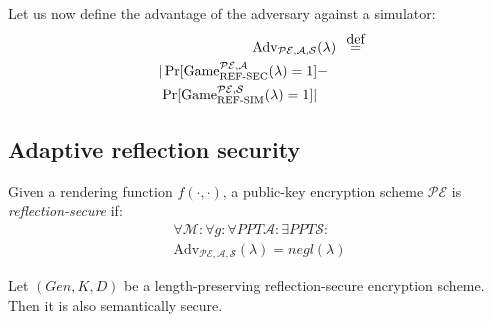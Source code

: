 Let us now define the advantage of the adversary against a simulator:
\begin{align*}
    \text{Adv}_{\mathcal{PE}, \mathcal{A}, \mathcal{S}}&(\lambda) &\defeq\\
    |\Pr[\text{Game}_{\text{REF-SEC}}^{\mathcal{PE},\mathcal{A}}(\lambda) = 1] &-\\
    \Pr[\text{Game}_{\text{REF-SIM}}^{\mathcal{PE},\mathcal{S}}(\lambda) = 1]| &
\end{align*}

\subsection{Adaptive reflection security}\label{subsec:adaptiverefsec}

Given a rendering function $f(\cdot, \cdot)$, a public-key encryption
scheme $\mathcal{PE}$ is \textit{reflection-secure} if:
\begin{align*}
    \forall \mathcal{M}:
    \forall g:
    \forall PPT \mathcal{A}:
    \exists PPT \mathcal{S}:\\
    \text{Adv}_{\mathcal{PE}, \mathcal{A}, \mathcal{S}}(\lambda) = negl(\lambda)
\end{align*}

\begin{lemma}
    Let $(Gen, K, D)$ be a length-preserving reflection-secure encryption
    scheme. Then it is also semantically secure.
\end{lemma}

